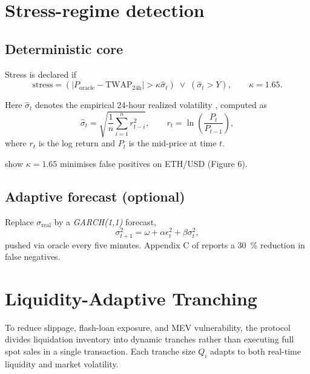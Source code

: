 \documentclass[11pt]{article}
\begin{document}
\section{Stress-regime detection}
\label{sec:stress}

\subsection{Deterministic core}

Stress is declared if
\begin{equation}\label{eq:stress-core}
\text{stress} =
\left( \left| P_{\text{oracle}} - \text{TWAP}_{24\mathrm{h}} \right| > \kappa \widehat{\sigma}_{t} \right)
\;\lor\;
\left( \widehat{\sigma}_{t} > Y \right),
\qquad \kappa = 1.65.
\end{equation}

Here \( \widehat{\sigma}_t \) denotes the empirical 24-hour realized volatility \parencite{andersen2003realized}, computed as
\begin{equation}
\widehat{\sigma}_{t} = \sqrt{\frac{1}{n} \sum_{i=1}^{n} r_{t-i}^2}, 
\qquad
r_t = \ln\left( \frac{P_t}{P_{t-1}} \right),
\end{equation}
where \( r_t \) is the log return and \( P_t \) is the mid-price at time \( t \).


\parencite{tian2025defi} show $\kappa = 1.65$ minimises false positives on
ETH/USD (Figure 6).

\subsection{Adaptive forecast (optional)}
Replace $\sigma_{\text{real}}$ by a \emph{GARCH(1,1)} forecast,
\[
\sigma_{t+1}^2 = \omega + \alpha \epsilon_t^2 + \beta \sigma_t^2,
\]
pushed via oracle every five minutes.  
Appendix C of \citeauthor{tian2025defi} reports a
\SI{30}{\percent} reduction in false negatives.

\section{Liquidity-Adaptive Tranching}
\label{sec:tranch}
To reduce slippage, flash-loan exposure, and MEV vulnerability, the protocol divides liquidation inventory into dynamic tranches rather than executing full spot sales in a single transaction. Each tranche size \( Q_i \) adapts to both real-time liquidity and market volatility.
\end{document}
